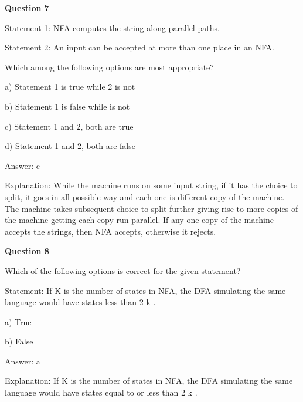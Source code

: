 \documentclass{article}
\begin{document}
\begin{mdframed}[linewidth=1pt, roundcorner=5pt, linecolor=gray!30, backgroundcolor=gray!5]
\textbf{Question 7} 

Statement 1: NFA computes the string along parallel paths.

Statement 2: An input can be accepted at more than one place in an NFA.

Which among the following options are most appropriate?

a) Statement 1 is true while 2 is not

b) Statement 1 is false while is not

c) Statement 1 and 2, both are true

d) Statement 1 and 2, both are false
\vspace{5pt} \par
\begin{tcolorbox}[colback=green!5, colframe=green!40!black, title=Solution]
Answer: c

Explanation: While the machine runs on some input string, if it has the choice to split, it goes in all possible way and each one is different copy of the machine. The machine takes subsequent choice to split further giving rise to more copies of the machine getting each copy run parallel. If any one copy of the machine accepts the strings, then NFA accepts, otherwise it rejects.
\end{tcolorbox}
\end{mdframed}

\begin{mdframed}[linewidth=1pt, roundcorner=5pt, linecolor=gray!30, backgroundcolor=gray!5]
\textbf{Question 8} 

Which of the following options is correct for the given statement?

Statement: If K is the number of states in NFA, the DFA simulating the same language would have states less than 2
k
.

a) True

b) False
\vspace{5pt} \par
\begin{tcolorbox}[colback=green!5, colframe=green!40!black, title=Solution]
Answer: a

Explanation: If K is the number of states in NFA, the DFA simulating the same language would have states equal to or less than 2
k
.
\end{tcolorbox}
\end{mdframed}
\end{document}
